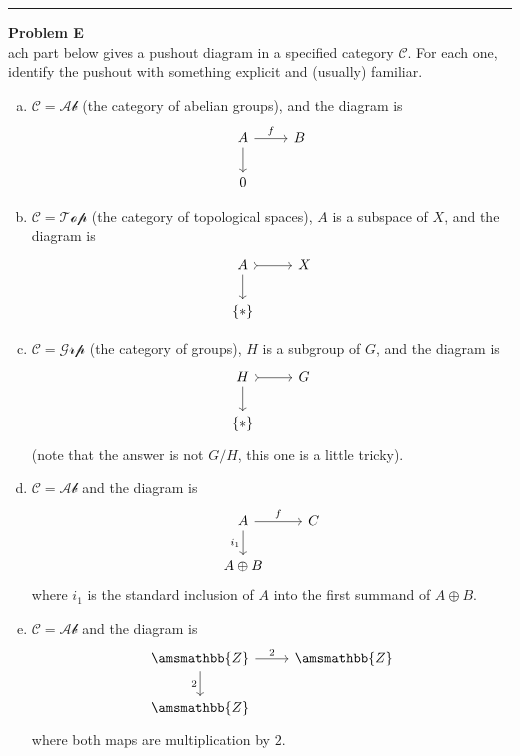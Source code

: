 \documentclass[a4paper, 12pt]{article}
\newenvironment{problem}[2][Problem]
    { \begin{mdframed}[backgroundcolor=gray!20] \textbf{#1 #2} \\}
    {  \end{mdframed}}
\renewcommand{\mathbb}{\amsmathbb}
\begin{document}
\noindent\rule{7in}{2.8pt}
\begin{problem}
Each part below gives a pushout diagram in a specified category \(\mathcal{C}\). For each one, identify the pushout with something explicit and (usually) familiar. 
\begin{enumerate}[(a)]
\item \(\mathcal{C}=\mathcal{Ab}\) (the category of abelian groups), and the diagram is 
\[\begin{tikzcd}
	A & B \\
	0
	\arrow["f", from=1-1, to=1-2]
	\arrow[from=1-1, to=2-1]
\end{tikzcd}\]
\item \(\mathcal{C}=\mathcal{Top}\) (the category of topological spaces), \(A\) is a subspace of \(X\), and the diagram is 
\[\begin{tikzcd}
	A & X \\
	{\left\{*\right\}}
	\arrow[tail, from=1-1, to=1-2]
	\arrow[from=1-1, to=2-1]
\end{tikzcd}\]
\item \(\mathcal{C}=\mathcal{Grp}\) (the category of groups), \(H\) is a subgroup of \(G\), and the diagram is 
\[\begin{tikzcd}
	H & G \\
	{\left\{*\right\}}
	\arrow[tail, from=1-1, to=1-2]
	\arrow[from=1-1, to=2-1]
\end{tikzcd}\]
(note that the answer is not \(G/H\), this one is a little tricky).
\item \(\mathcal{C}=\mathcal{Ab}\) and the diagram is 
\[\begin{tikzcd}
	A & C \\
	{A\oplus B}
	\arrow["f", from=1-1, to=1-2]
	\arrow["{i_1}"', from=1-1, to=2-1]
\end{tikzcd}\]
where \(i_1\) is the standard inclusion of \(A\) into the first summand of \(A\oplus B\).
\item \(\mathcal{C}=\mathcal{Ab}\) and the diagram is 
\[\begin{tikzcd}
	{\mathbb{Z}} & {\mathbb{Z}} \\
	{\mathbb{Z}}
	\arrow["2", from=1-1, to=1-2]
	\arrow["2"', from=1-1, to=2-1]
\end{tikzcd}\]
where both maps are multiplication by \(2\).

\end{enumerate}
\end{problem}
\end{document}
